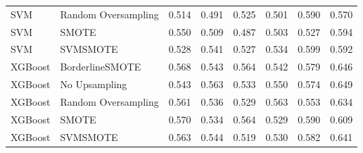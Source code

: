 \begin{tabular}{llllllll}
                         SVM & Random Oversampling & 0.514 &                     0.491 &                 0.525 &                  0.501 &                                   0.590 &     0.570 \\
                         SVM &               SMOTE & 0.550 &                     0.509 &                 0.487 &                  0.503 &                                   0.527 &     0.594 \\
                         SVM &            SVMSMOTE & 0.528 &                     0.541 &                 0.527 &                  0.534 &                                   0.599 &     0.592 \\
                     XGBoost &     BorderlineSMOTE & 0.568 &                     0.543 &                 0.564 &                  0.542 &                                   0.579 &     0.646 \\
                     XGBoost &       No Upsampling & 0.543 &                     0.563 &                 0.533 &                  0.550 &                                   0.574 &     0.649 \\
                     XGBoost & Random Oversampling & 0.561 &                     0.536 &                 0.529 &                  0.563 &                                   0.553 &     0.634 \\
                     XGBoost &               SMOTE & 0.570 &                     0.534 &                 0.564 &                  0.529 &                                   0.590 &     0.609 \\
                     XGBoost &            SVMSMOTE & 0.563 &                     0.544 &                 0.519 &                  0.530 &                                   0.582 &     0.641 \\
\bottomrule
\end{tabular}
